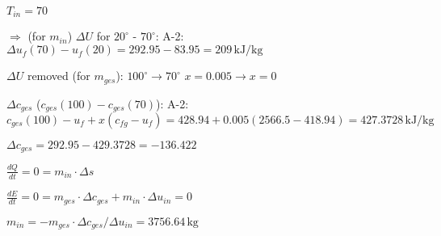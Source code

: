 \( T_{in} = 70 \)  

\(\Rightarrow\) (for \( m_{in} \)) \( \Delta U \) for \( 20^\circ \) - \( 70^\circ \):  
A-2:  
\( \Delta u_f(70) - u_f(20) = 292.95 - 83.95 = 209 \, \text{kJ/kg} \)  

\( \Delta U \) removed (for \( m_{ges} \)):  
\( 100^\circ \rightarrow 70^\circ \)  
\( x = 0.005 \rightarrow x = 0 \)  

\( \Delta c_{ges} \) (\( c_{ges}(100) - c_{ges}(70) \)):  
A-2:  
\( c_{ges}(100) - u_f + x(c_{fg} - u_f) = 428.94 + 0.005(2566.5 - 418.94) = 427.3728 \, \text{kJ/kg} \)  

\( \Delta c_{ges} = 292.95 - 429.3728 = -136.422 \)  

\( \frac{dQ}{dt} = 0 = m_{in} \cdot \Delta s \)  

\( \frac{dE}{dt} = 0 = m_{ges} \cdot \Delta c_{ges} + m_{in} \cdot \Delta u_{in} = 0 \)  

\( m_{in} = -m_{ges} \cdot \Delta c_{ges} / \Delta u_{in} = 3756.64 \, \text{kg} \)